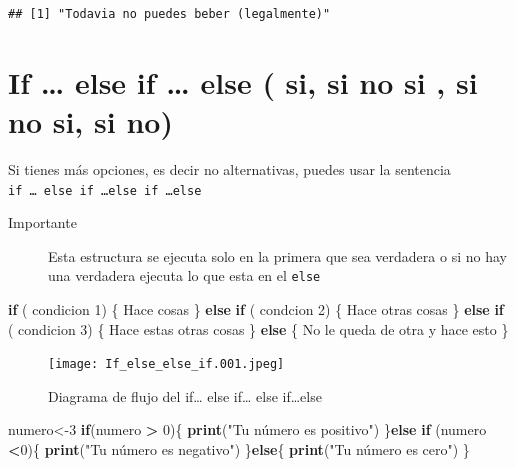 \documentclass[
]{book}
\newenvironment{Shaded}{\begin{snugshade}}{\end{snugshade}}
\newcommand{\ControlFlowTok}[1]{\textcolor[rgb]{0.13,0.29,0.53}{\textbf{#1}}}
\newcommand{\DecValTok}[1]{\textcolor[rgb]{0.00,0.00,0.81}{#1}}
\newcommand{\FunctionTok}[1]{\textcolor[rgb]{0.13,0.29,0.53}{\textbf{#1}}}
\newcommand{\NormalTok}[1]{#1}
\newcommand{\OtherTok}[1]{\textcolor[rgb]{0.56,0.35,0.01}{#1}}
\newcommand{\SpecialCharTok}[1]{\textcolor[rgb]{0.81,0.36,0.00}{\textbf{#1}}}
\newcommand{\StringTok}[1]{\textcolor[rgb]{0.31,0.60,0.02}{#1}}
\begin{document}
\begin{verbatim}
## [1] "Todavia no puedes beber (legalmente)"
\end{verbatim}

\section{If \ldots{} else if \ldots{} else ( si, si no si , si no si, si no)}\label{if-else-if-else-si-si-no-si-si-no-si-si-no}

Si tienes más opciones, es decir no alternativas, puedes usar la sentencia \texttt{if\ …\ else\ if\ …else\ if\ …else}

\begin{description}
\item[Importante]
Esta estructura se ejecuta solo en la primera que sea verdadera o si no hay una verdadera ejecuta lo que esta en el \texttt{else}
\end{description}

\begin{Shaded}
\begin{Highlighting}[]
\ControlFlowTok{if}\NormalTok{ ( condicion }\DecValTok{1}\NormalTok{) \{}
\NormalTok{Hace cosas}
\NormalTok{\} }\ControlFlowTok{else} \ControlFlowTok{if}\NormalTok{ ( condcion }\DecValTok{2}\NormalTok{) \{}
\NormalTok{Hace otras cosas}
\NormalTok{\} }\ControlFlowTok{else} \ControlFlowTok{if}\NormalTok{ ( condicion }\DecValTok{3}\NormalTok{) \{}
\NormalTok{Hace estas otras cosas}
\NormalTok{\} }\ControlFlowTok{else}\NormalTok{ \{}
\NormalTok{No le queda de otra y hace esto}
\NormalTok{\}}
\end{Highlighting}
\end{Shaded}

\begin{figure}
\centering
\texttt{[image: If\_else\_else\_if.001.jpeg]}
\caption{Diagrama de flujo del if\ldots{} else if\ldots{} else if\ldots else}\label{id}
\end{figure}

\begin{Shaded}
\begin{Highlighting}[]
\NormalTok{numero}\OtherTok{\textless{}{-}}\DecValTok{3}
\ControlFlowTok{if}\NormalTok{(numero }\SpecialCharTok{\textgreater{}} \DecValTok{0}\NormalTok{)\{}
  \FunctionTok{print}\NormalTok{(}\StringTok{"Tu número es positivo"}\NormalTok{)}
\NormalTok{\}}\ControlFlowTok{else} \ControlFlowTok{if}\NormalTok{ (numero }\SpecialCharTok{\textless{}}\DecValTok{0}\NormalTok{)\{}
  \FunctionTok{print}\NormalTok{(}\StringTok{"Tu número es negativo"}\NormalTok{)}
\NormalTok{\}}\ControlFlowTok{else}\NormalTok{\{}
  \FunctionTok{print}\NormalTok{(}\StringTok{"Tu número es cero"}\NormalTok{)}
\NormalTok{\}}
\end{Highlighting}
\end{Shaded}
\end{document}
